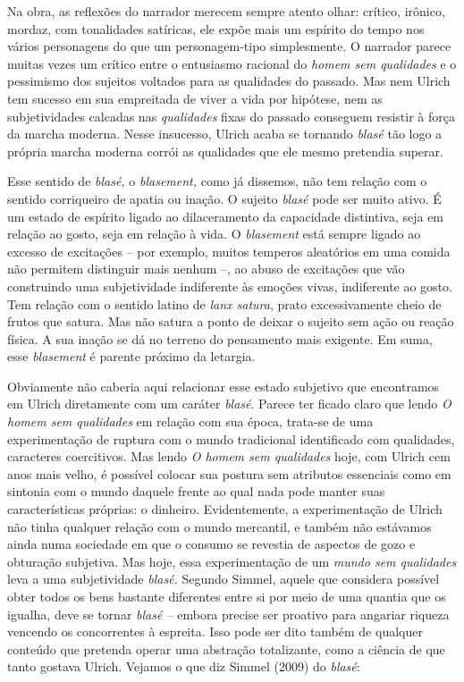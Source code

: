 Na obra, as reflexões do narrador merecem sempre atento olhar: crítico,
irônico, mordaz, com tonalidades satíricas, ele expõe mais um espírito
do tempo nos vários personagens do que um personagem-tipo simplesmente.
O narrador parece muitas vezes um crítico entre o entusiasmo racional do
\emph{homem sem qualidades} e o pessimismo dos sujeitos voltados para as
qualidades do passado. Mas nem Ulrich tem sucesso em sua empreitada de
viver a vida por hipótese, nem as subjetividades calcadas nas
\emph{qualidades} fixas do passado conseguem resistir à força da marcha
moderna. Nesse insucesso, Ulrich acaba se tornando \emph{blasé} tão logo
a própria marcha moderna corrói as qualidades que ele mesmo pretendia
superar.

Esse sentido de \emph{blasé,} o \emph{blasement,} como já dissemos, não
tem relação com o sentido corriqueiro de apatia ou inação. O sujeito
\emph{blasé} pode ser muito ativo. É um estado de espírito ligado ao
dilaceramento da capacidade distintiva, seja em relação ao gosto, seja
em relação à vida. O \emph{blasement} está sempre ligado ao excesso de
excitações -- por exemplo, muitos temperos aleatórios em uma comida não
permitem distinguir mais nenhum --, ao abuso de excitações que vão
construindo uma subjetividade indiferente às emoções vivas, indiferente
ao gosto. Tem relação com o sentido latino de \emph{lanx satura}, prato
excessivamente cheio de frutos que satura. Mas não satura a ponto de
deixar o sujeito sem ação ou reação física. A sua inação se dá no
terreno do pensamento mais exigente. Em suma, esse \emph{blasement} é
parente próximo da letargia.

Obviamente não caberia aqui relacionar esse estado subjetivo que
encontramos em Ulrich diretamente com um caráter \emph{blasé}. Parece
ter ficado claro que lendo \emph{O homem sem qualidades} em relação com
sua época, trata-se de uma experimentação de ruptura com o mundo
tradicional identificado com qualidades, caracteres coercitivos. Mas
lendo \emph{O homem sem qualidades} hoje, com Ulrich cem anos mais
velho, é possível colocar sua postura sem atributos essenciais como em
sintonia com o mundo daquele frente ao qual nada pode manter suas
características próprias: o dinheiro. Evidentemente, a experimentação de
Ulrich não tinha qualquer relação com o mundo mercantil, e também não
estávamos ainda numa sociedade em que o consumo se revestia de aspectos
de gozo e obturação subjetiva. Mas hoje, essa experimentação de um
\emph{mundo sem qualidades} leva a uma subjetividade \emph{blasé.}
Segundo Simmel, aquele que considera possível obter todos os bens
bastante diferentes entre si por meio de uma quantia que os igualha,
deve se tornar \emph{blasé --} embora precise ser proativo para angariar
riqueza vencendo os concorrentes à espreita. Isso pode ser dito também
de qualquer conteúdo que pretenda operar uma abstração totalizante, como
a ciência de que tanto gostava Ulrich. Vejamos o que diz Simmel (2009)
do \emph{blasé}:

